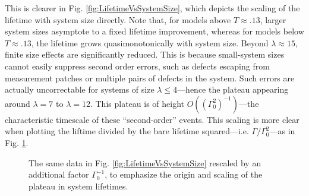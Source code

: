 \documentclass[twocolumn,superscriptaddress,aps,prb,floatfix]{revtex4-1}
\newcommand{\figref}[1]{Fig. \ref{#1}}
\begin{document}
This is clearer in \figref{fig:LifetimeVsSystemSize}, which depicts the scaling of the lifetime with system size directly.  Note that, for models above $T\approx.13$, larger system sizes asymptote to a fixed lifetime improvement, whereas for models below $T\approx.13$, the lifetime grows quasimonotonically with system size.  Beyond $\lambda\approx15$, finite size effects are significantly reduced.  This is because small-system sizes cannot easily suppress second order errors, such as defects escaping from measurement patches or multiple pairs of defects in the system.  Such errors are actually uncorrectable for systems of size $\lambda\leq4$---hence the plateau appearing around $\lambda=7$ to $\lambda=12$.  This plateau is of height $O((\Gamma_0^2)^{-1})$---the characteristic timescale of these ``second-order'' events.  This scaling is more clear when plotting the liftime divided by the bare lifetime squared---i.e. $\Gamma / \Gamma_0^2$---as in \figref{fig:LifetimeVsSystemSizeReduced}.


\begin{figure}
\begin{center}
\end{center}
\caption{The same data in \figref{fig:LifetimeVsSystemSize} rescaled by an additional factor $\Gamma_0^{-1}$, to emphasize the origin and scaling of the plateau in system lifetimes.}
\label{fig:LifetimeVsSystemSizeReduced}
\end{figure}
\end{document}
